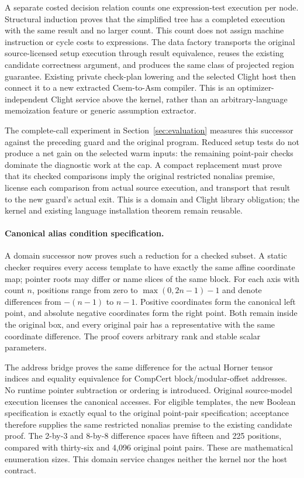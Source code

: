 A separate costed decision relation counts one expression-test execution per
node. Structural induction proves that the simplified tree has a completed
execution with the same result and no larger count. This count does not assign
machine instruction or cycle costs to expressions. The data factory transports
the original source-licensed setup execution through result equivalence, reuses
the existing candidate correctness argument, and produces the same class of
projected region guarantee. Existing private check-plan lowering and the
selected Clight host then connect it to a new extracted Csem-to-Asm compiler.
This is an optimizer-independent Clight service above the kernel, rather than
an arbitrary-language memoization feature or generic assumption extractor.

The complete-call experiment in Section~\ref{sec:evaluation} measures this
successor against the preceding guard and the original program. Reduced setup
tests do not produce a net gain on the selected warm inputs: the remaining
point-pair checks dominate the diagnostic work at the cap. A compact replacement
must prove that its checked comparisons imply the original restricted nonalias
premise, license each comparison from actual source execution, and transport
that result to the new guard's actual exit. This is a domain and Clight library
obligation; the kernel and existing language installation theorem remain reusable.

\paragraph{Canonical alias condition specification.}
A domain successor now proves such a reduction for a checked subset. A static
checker requires every access template to have exactly the same affine
coordinate map; pointer roots may differ or name slices of the same block.
For each axis with count $n$, positions range from zero to
$\max(0,2n-1)-1$ and denote differences from $-(n-1)$ to $n-1$.
Positive coordinates form the canonical left point, and absolute negative
coordinates form the right point. Both remain inside the original box, and
every original pair has a representative with the same coordinate difference.
The proof covers arbitrary rank and stable scalar parameters.

The address bridge proves the same difference for the actual Horner tensor
indices and equality equivalence for CompCert block/modular-offset addresses.
No runtime pointer subtraction or ordering is introduced. Original source-model
execution licenses the canonical accesses. For eligible templates, the new
Boolean specification is exactly equal to the original point-pair specification;
acceptance therefore supplies the same restricted nonalias premise to the
existing candidate proof. The 2-by-3 and 8-by-8 difference spaces have fifteen
and 225 positions, compared with thirty-six and 4,096 original point pairs.
These are mathematical enumeration sizes. This domain service changes neither
the kernel nor the host contract.

